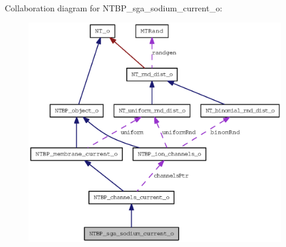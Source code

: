 Collaboration diagram for NTBP\_\-sga\_\-sodium\_\-current\_\-o:
\nopagebreak
\begin{figure}[H]
\begin{center}
\leavevmode
\includegraphics[width=400pt]{class_n_t_b_p__sga__sodium__current__o__coll__graph}
\end{center}
\end{figure}
